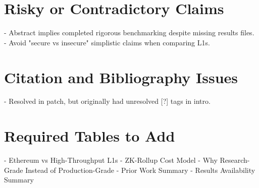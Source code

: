 \documentclass[12pt]{article}
\begin{document}
\section{Risky or Contradictory Claims}
- Abstract implies completed rigorous benchmarking despite missing results files.
- Avoid "secure vs insecure" simplistic claims when comparing L1s.

\section{Citation and Bibliography Issues}
- Resolved in patch, but originally had unresolved [?] tags in intro.

\section{Required Tables to Add}
- Ethereum vs High-Throughput L1s
- ZK-Rollup Cost Model
- Why Research-Grade Instead of Production-Grade
- Prior Work Summary
- Results Availability Summary
\end{document}
